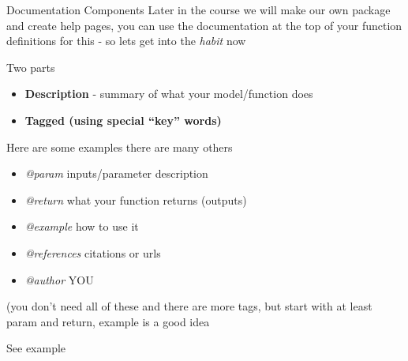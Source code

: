 \documentclass[
  ignorenonframetext,
]{beamer}
\providecommand{\tightlist}{%
  \setlength{\itemsep}{0pt}\setlength{\parskip}{0pt}}
\begin{document}
\begin{frame}{{Documentation Components}}
\protect\hypertarget{documentation-components}{}
Later in the course we will make our own package and create help pages,
you can use the documentation at the top of your function definitions
for this - so lets get into the \emph{habit} now

Two parts

\begin{itemize}
\tightlist
\item
  \textbf{Description} - summary of what your model/function does
\item
  \textbf{Tagged (using special ``key'' words)}
\end{itemize}

Here are some examples there are many others

\begin{itemize}
\tightlist
\item
  \emph{@param} inputs/parameter description
\item
  \emph{@return} what your function returns (outputs)
\item
  \emph{@example} how to use it
\item
  \emph{@references} citations or urls
\item
  \emph{@author} YOU
\end{itemize}

(you don't need all of these and there are more tags, but start with at
least param and return, example is a good idea

See example
\end{frame}
\end{document}
